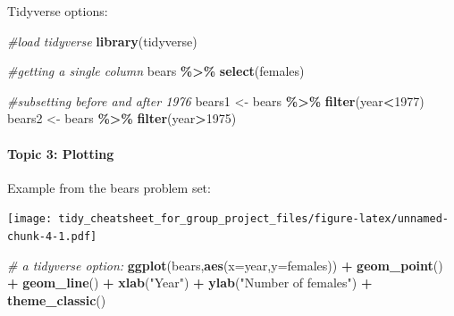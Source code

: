 \documentclass[
]{article}
\newenvironment{Shaded}{\begin{snugshade}}{\end{snugshade}}
\newcommand{\AttributeTok}[1]{\textcolor[rgb]{0.13,0.29,0.53}{#1}}
\newcommand{\CommentTok}[1]{\textcolor[rgb]{0.56,0.35,0.01}{\textit{#1}}}
\newcommand{\DecValTok}[1]{\textcolor[rgb]{0.00,0.00,0.81}{#1}}
\newcommand{\FunctionTok}[1]{\textcolor[rgb]{0.13,0.29,0.53}{\textbf{#1}}}
\newcommand{\NormalTok}[1]{#1}
\newcommand{\OtherTok}[1]{\textcolor[rgb]{0.56,0.35,0.01}{#1}}
\newcommand{\SpecialCharTok}[1]{\textcolor[rgb]{0.81,0.36,0.00}{\textbf{#1}}}
\newcommand{\StringTok}[1]{\textcolor[rgb]{0.31,0.60,0.02}{#1}}
\begin{document}
Tidyverse options:

\begin{Shaded}
\begin{Highlighting}[]
\CommentTok{\#load tidyverse}
\FunctionTok{library}\NormalTok{(tidyverse)}

\CommentTok{\#getting a single column}
\NormalTok{bears }\SpecialCharTok{\%\textgreater{}\%} \FunctionTok{select}\NormalTok{(females)}

\CommentTok{\#subsetting before and after 1976}
\NormalTok{bears1 }\OtherTok{\textless{}{-}}\NormalTok{ bears }\SpecialCharTok{\%\textgreater{}\%} \FunctionTok{filter}\NormalTok{(year}\SpecialCharTok{\textless{}}\DecValTok{1977}\NormalTok{)}
\NormalTok{bears2 }\OtherTok{\textless{}{-}}\NormalTok{ bears }\SpecialCharTok{\%\textgreater{}\%} \FunctionTok{filter}\NormalTok{(year}\SpecialCharTok{\textgreater{}}\DecValTok{1975}\NormalTok{)}
\end{Highlighting}
\end{Shaded}

\hypertarget{topic-3-plotting}{%
\paragraph{Topic 3: Plotting}\label{topic-3-plotting}}

Example from the bears problem set:

\begin{Shaded}
\end{Shaded}

\texttt{[image: tidy\_cheatsheet\_for\_group\_project\_files/figure-latex/unnamed-chunk-4-1.pdf]}

\begin{Shaded}
\begin{Highlighting}[]
\CommentTok{\# a tidyverse option: }
\FunctionTok{ggplot}\NormalTok{(bears,}\FunctionTok{aes}\NormalTok{(}\AttributeTok{x=}\NormalTok{year,}\AttributeTok{y=}\NormalTok{females)) }\SpecialCharTok{+}
  \FunctionTok{geom\_point}\NormalTok{() }\SpecialCharTok{+}
  \FunctionTok{geom\_line}\NormalTok{() }\SpecialCharTok{+}
  \FunctionTok{xlab}\NormalTok{(}\StringTok{"Year"}\NormalTok{) }\SpecialCharTok{+}
  \FunctionTok{ylab}\NormalTok{(}\StringTok{"Number of females"}\NormalTok{) }\SpecialCharTok{+}
  \FunctionTok{theme\_classic}\NormalTok{()}
\end{Highlighting}
\end{Shaded}
\end{document}

